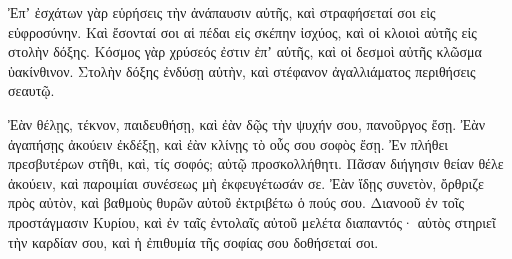 {Ἐπʼ ἐσχάτων γὰρ εὑρήσεις τὴν ἀνάπαυσιν αὐτῆς, καὶ στραφήσεταί σοι εἰς εὐφροσύνην.
Καὶ ἔσονταί σοι αἱ πέδαι εἰς σκέπην ἰσχύος, καὶ οἱ κλοιοὶ αὐτῆς εἰς στολὴν δόξης.
Κόσμος γὰρ χρύσεός ἐστιν ἐπʼ αὐτῆς, καὶ οἱ δεσμοὶ αὐτῆς κλῶσμα ὑακίνθινον.
Στολὴν δόξης ἐνδύσῃ αὐτὴν, καὶ στέφανον ἀγαλλιάματος περιθήσεις σεαυτῷ.
\par }{\PP {}Ἐὰν θέλῃς, τέκνον, παιδευθήσῃ, καὶ ἐὰν δῷς τὴν ψυχήν σου, πανοῦργος ἔσῃ.
Ἐὰν ἀγαπήσῃς ἀκούειν ἐκδέξῃ, καὶ ἐὰν κλίνῃς τὸ οὖς σου σοφὸς ἔσῃ.
Ἐν πλήθει πρεσβυτέρων στῆθι, καὶ, τίς σοφός; αὐτῷ προσκολλήθητι.
Πᾶσαν διήγησιν θείαν θέλε ἀκούειν, καὶ παροιμίαι συνέσεως μὴ ἐκφευγέτωσάν σε.
Ἐὰν ἴδῃς συνετὸν, ὄρθριζε πρὸς αὐτὸν, καὶ βαθμοὺς θυρῶν αὐτοῦ ἐκτριβέτω ὁ πούς σου.
Διανοοῦ ἐν τοῖς προστάγμασιν Κυρίου, καὶ ἐν ταῖς ἐντολαῖς αὐτοῦ μελέτα διαπαντός· αὐτὸς στηριεῖ τὴν καρδίαν σου, καὶ ἡ ἐπιθυμία τῆς σοφίας σου δοθήσεταί σοι.

}
